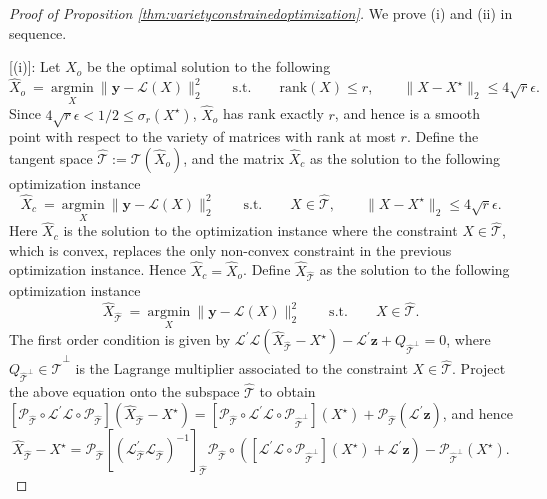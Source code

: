 \documentclass[11pt,letterpaper]{article}
\newcommand{\by}{\mathbf{y}}
\newcommand{\bz}{\mathbf{z}}
\newcommand{\ct}{\mathcal{T}}
\newcommand{\cp}{\mathcal{P}}
\begin{document}
\begin{proof}[Proof of Proposition \ref{thm:varietyconstrainedoptimization}] We prove (i) and (ii) in sequence.
	
	[(i)]: Let $\hat{X}_o$ be the optimal solution to the following
	\begin{equation*}
		\hat{X}_o ~=~ \underset{X}{\mathrm{argmin}}~\| \by - \mathcal{L}(X) \|^2_2 \quad\quad
		\mathrm{s.t.} \quad\quad \mathrm{rank}(X) \leq r, \quad\quad \| X - X^{\star} \|_2 \leq 4 \sqrt{r} \epsilon.
	\end{equation*}
	Since $4 \sqrt{r} \epsilon < 1/2 \leq \sigma_r (X^{\star})$, $\hat{X}_o$ has rank exactly $r$, and hence is a smooth point with respect to the variety of matrices with rank at most $r$. Define the tangent space $\hat{\ct}:= \ct (\hat{X}_o)$, and the matrix $\hat{X}_c$ as the solution to the following optimization instance
	\begin{equation*}
		\hat{X}_{c}~=~\underset{X}{\mathrm{argmin}}~\| \by - \mathcal{L}(X) \|^2_2  \quad\quad \mathrm{s.t.} \quad\quad X \in \hat{\ct}, \quad\quad \| X - X^{\star} \|_2 \leq 4 \sqrt{r} \epsilon.
	\end{equation*}
	Here $\hat{X}_c$ is the solution to the optimization instance where the constraint $X \in \hat{\ct}$, which is convex, replaces the only non-convex constraint in the previous optimization instance. Hence $\hat{X}_{c} = \hat{X}_o$.  Define $\hat{X}_{\hat{\ct}}$ as the solution to the following optimization instance
	\begin{equation*}
		\hat{X}_{\hat{\ct}}~=~\underset{X}{\mathrm{argmin}} ~\| \by - \mathcal{L}(X) \|^2_2 \quad \quad
		\mathrm{s.t.} \quad \quad X \in \hat{\ct}.
	\end{equation*}
	The first order condition is given by $\mathcal{L}^{\prime} \mathcal{L} ( \hat{X}_{\hat{\ct}} - X^{\star}) - \mathcal{L}^{\prime} \bz + Q_{\hat{\ct}^{\perp}} = 0$,	where $Q_{\hat{\ct}^{\perp}} \in \hat{\ct}^{\perp}$ is the Lagrange multiplier associated to the constraint $X \in \hat{\ct}$. Project the above equation onto the subspace $\hat{\ct}$ to obtain $[\cp_{\hat{\ct}} \circ \mathcal{L}^{\prime} \mathcal{L} \circ \cp_{\hat{\ct}}] ( \hat{X}_{\hat{\ct}} - X^{\star}) = [\cp_{\hat{\ct}} \circ \mathcal{L}^{\prime} \mathcal{L} \circ \cp_{\hat{\ct}^{\perp}}] (X^{\star}) + \cp_{\hat{\ct}} (\mathcal{L}^{\prime}\bz)$, and hence
	\begin{equation*}
		\hat{X}_{\hat{\ct}} - X^{\star} = \cp_{\hat{\ct}} [(\mathcal{L}^{\prime}_{\hat{\ct}}\mathcal{L}_{\hat{\ct}})^{-1}]_{\hat{\ct}} \cp_{\hat{\ct}} \circ \left( [\mathcal{L}^{\prime} \mathcal{L} \circ \cp_{\hat{\ct}^{\perp}}] (X^{\star}) + \mathcal{L}^{\prime}\bz \right) - \cp_{\hat{\ct}^{\perp}} (X^{\star}).
	\end{equation*}
	

\end{proof}
\end{document}
